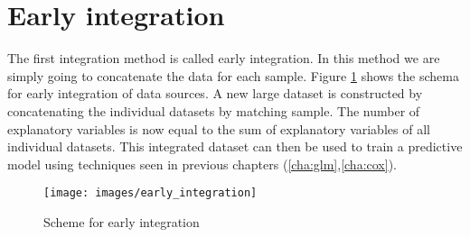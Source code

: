\section{Early integration}
\label{sec:integration-early}
The first integration method is called early integration. In this method we are simply going to concatenate the data for each sample. Figure \ref{fig:integration-early} shows the schema for early integration of data sources. A new large dataset is constructed by concatenating the individual datasets by matching sample. The number of explanatory variables is now equal to the sum of explanatory variables of all individual datasets. This integrated dataset can then be used to train a predictive model using techniques seen in previous chapters (\ref{cha:glm},\ref{cha:cox}).
\begin{figure}
	\centering
	\texttt{[image: images/early\_integration]}
	\caption{Scheme for early integration}
	\label{fig:integration-early}
\end{figure}
